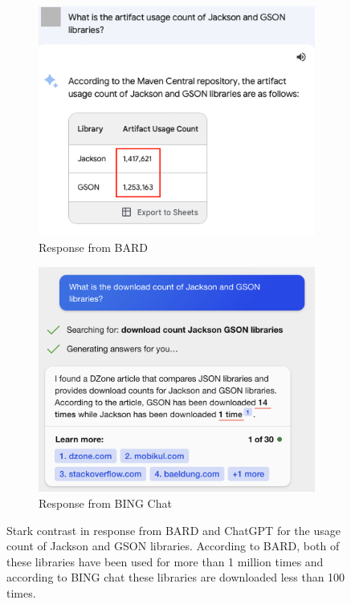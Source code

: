 \begin{figure}
    \centering
    \begin{subfigure}{.48\textwidth}
    \centering
        \includegraphics[scale=.45]{images/BARD-donwload-count-1.png}
        \caption{Response from BARD}
    \label{fig:bard-download}
    \end{subfigure}
    \begin{subfigure}{.48\textwidth}
    \centering
        \includegraphics[scale=.45]{images/BING-download-count.png}
        \caption{Response from BING Chat}
    \label{fig:chatgpt-download}
    \end{subfigure}
    \caption{Stark contrast in response from BARD and ChatGPT for the usage count of Jackson and GSON libraries. According to BARD, both of these libraries have been used for more than 1 million times and according to BING chat these libraries are downloaded less than 100 times.}
    \label{fig:chatbot-comparison-download}
\end{figure}

